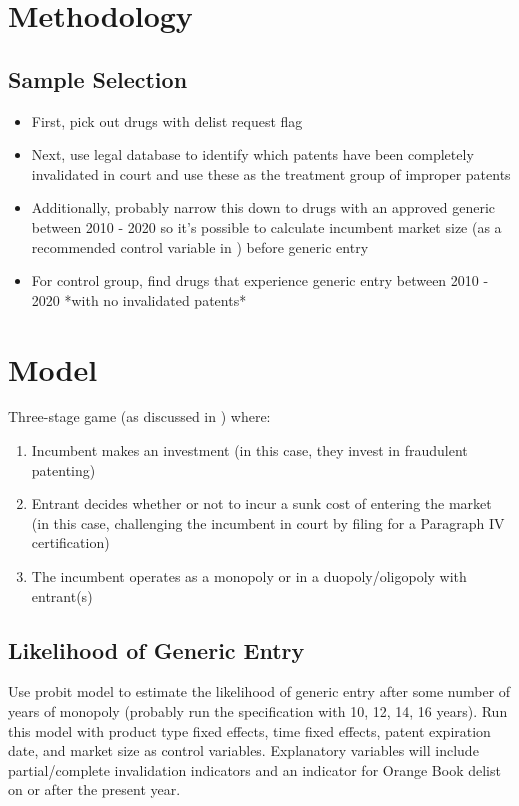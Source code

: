 \documentclass[12pt,a4paper]{article}
\begin{document}
\section{Methodology}


\subsection{Sample Selection}

\begin{itemize}
    \item First, pick out drugs with delist request flag
    \item Next, use legal database to identify which patents have been completely invalidated in court and use these as the treatment group of improper patents
    \item Additionally, probably narrow this down to drugs with an approved generic between 2010 - 2020 so it's possible to calculate incumbent market size (as a recommended control variable in \cite{ellison2011}) before generic entry
    \item For control group, find drugs that experience generic entry between 2010 - 2020 *with no invalidated patents*
\end{itemize}

\section{Model}

Three-stage game (as discussed in \cite{ellison2011}) where:
\begin{enumerate}
    \item Incumbent makes an investment (in this case, they invest in fraudulent patenting)
    \item Entrant decides whether or not to incur a sunk cost of entering the market (in this case, challenging the incumbent in court by filing for a Paragraph IV certification)
    \item The incumbent operates as a monopoly or in a duopoly/oligopoly with entrant(s)
\end{enumerate}


\subsection{Likelihood of Generic Entry}

Use probit model to estimate the likelihood of generic entry after some number of years of monopoly (probably run the specification with 10, 12, 14, 16 years). Run this model with product type fixed effects, time fixed effects, patent expiration date, and market size as control variables. Explanatory variables will include partial/complete invalidation indicators and an indicator for Orange Book delist on or after the present year.
\end{document}
